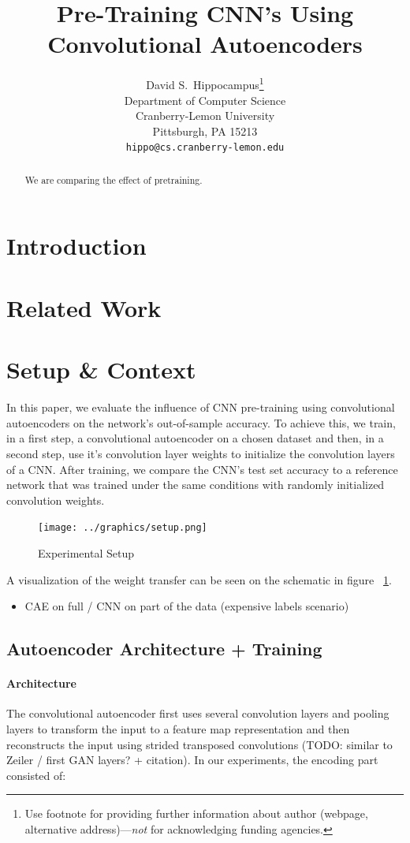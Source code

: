 \documentclass[draft]{article}
\title{Pre-Training CNN's Using Convolutional Autoencoders}
\author{
  David S.~Hippocampus\thanks{Use footnote for providing further
    information about author (webpage, alternative
    address)---\emph{not} for acknowledging funding agencies.} \\
  Department of Computer Science\\
  Cranberry-Lemon University\\
  Pittsburgh, PA 15213 \\
  \texttt{hippo@cs.cranberry-lemon.edu} \\
}
\begin{document}

\maketitle

\begin{abstract}
  We are comparing the effect of pretraining.
\end{abstract}

\section{Introduction}
\section{Related Work}
\section{Setup \& Context}
  
  In this paper, we evaluate the influence of CNN pre-training using convolutional autoencoders on the network's out-of-sample accuracy. To achieve this, we train, in a first step, a convolutional autoencoder on a chosen dataset and then, in a second step, use it's convolution layer weights to initialize the convolution layers of a CNN. After training, we compare the CNN's test set accuracy to a reference network that was trained under the same conditions with randomly initialized convolution weights. 

  \begin{figure}[h]
    \centering
    \texttt{[image: ../graphics/setup.png]}
    \caption{Experimental Setup}
    \label{fig:experimental_setup}
  \end{figure}

  A visualization of the weight transfer can be seen on the schematic in figure ~\ref{fig:experimental_setup}. 

  \begin{itemize}
    \item CAE on full / CNN on part of the data (expensive labels scenario)
  \end{itemize}

  \subsection{Autoencoder Architecture + Training}

    \paragraph{Architecture}
    The convolutional autoencoder first uses several convolution layers and pooling layers to transform the input to a feature map representation and then reconstructs the input using strided transposed convolutions (TODO: similar to Zeiler / first GAN layers? + citation). In our experiments, the encoding part consisted of:
\end{document}
